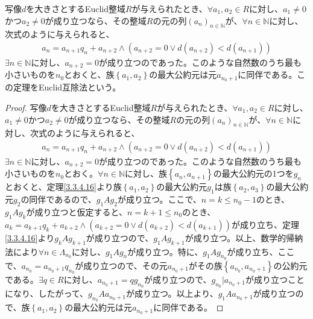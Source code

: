 \documentclass[dvipdfmx]{jsarticle}
\begin{document}
\begin{thm}[Euclid互除法]\label{3.3.4.17e}
写像$d$を大きさとするEuclid整域$R$が与えられたとき、$\forall a_{1},a_{2} \in R$に対し、$a_{1} \neq 0$かつ$a_{2} \neq 0$が成り立つなら、その整域$R$の元の列$\left( a_{n} \right)_{n \in \mathbb{N}}$が、$\forall n \in \mathbb{N}$に対し、次式のように与えられると、
\begin{align*}
a_{n} = a_{n + 1}q_{n} + a_{n + 2} \land \left( a_{n + 2} = 0 \vee d\left( a_{n + 2} \right) < d\left( a_{n + 1} \right) \right)
\end{align*}
$\exists n \in \mathbb{N}$に対し、$a_{n + 2} = 0$が成り立つのであった。このような自然数のうち最も小さいものを$n_{0}$とおくと、族$\left\{ a_{1},a_{2} \right\}$の最大公約元は元$a_{n_{0} + 1}$に同伴である。この定理をEuclid互除法という。
\end{thm}
\begin{proof}
写像$d$を大きさとするEuclid整域$R$が与えられたとき、$\forall a_{1},a_{2} \in R$に対し、$a_{1} \neq 0$かつ$a_{2} \neq 0$が成り立つなら、その整域$R$の元の列$\left( a_{n} \right)_{n \in \mathbb{N}}$が、$\forall n \in \mathbb{N}$に対し、次式のように与えられると、
\begin{align*}
a_{n} = a_{n + 1}q_{n} + a_{n + 2} \land \left( a_{n + 2} = 0 \vee d\left( a_{n + 2} \right) < d\left( a_{n + 1} \right) \right)
\end{align*}
$\exists n \in \mathbb{N}$に対し、$a_{n + 2} = 0$が成り立つのであった。このような自然数のうち最も小さいものを$n_{0}$とおく。$\forall n \in \mathbb{N}$に対し、族$\left\{ a_{n},a_{n + 1} \right\}$の最大公約元の1つを$g_{n}$とおくと、定理\ref{3.3.4.16}より族$\left\{ a_{1},a_{2} \right\}$の最大公約元$g_{1}$は族$\left\{ a_{2},a_{3} \right\}$の最大公約元$g_{2}$の同伴であるので、$g_{1}Ag_{2}$が成り立つ。ここで、$n = k \leq n_{0} - 1$のとき、$g_{1}Ag_{k}$が成り立つと仮定すると、$n = k + 1 \leq n_{0}$のとき、$a_{k} = a_{k + 1}q_{k} + a_{k + 2} \land \left( a_{k + 2} = 0 \vee d\left( a_{k + 2} \right) < d\left( a_{k + 1} \right) \right)$が成り立ち、定理\ref{3.3.4.16}より$g_{k}Ag_{k + 1}$が成り立つので、$g_{1}Ag_{k + 1}$が成り立つ。以上、数学的帰納法により$\forall n \in \varLambda_{n_{0}}$に対し、$g_{1}Ag_{n}$が成り立つ。特に、$g_{1}Ag_{n_{0}}$が成り立ち、ここで、$a_{n_{0}} = a_{n_{0} + 1}q_{n_{0}}$が成り立つので、その元$a_{n_{0} + 1}$がその族$\left\{ a_{n_{0}},a_{n_{0} + 1} \right\}$の公約元である。$\exists q \in R$に対し、$a_{n_{0} + 1} = qg_{n_{0}}$が成り立つので、$g_{n_{0}}|a_{n_{0} + 1}$が成り立つことになり、したがって、$g_{n_{0}}Aa_{n_{0} + 1}$が成り立つ。以上より、$g_{1}Aa_{n_{0} + 1}$が成り立つので、族$\left\{ a_{1},a_{2} \right\}$の最大公約元は元$a_{n_{0} + 1}$に同伴である。
\end{proof}
\end{document}
